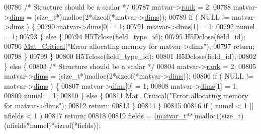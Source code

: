 \begin{DoxyCode}
00786             \textcolor{comment}{/* Structure should be a scalar */}
00787             matvar->\hyperlink{group___m_a_t_a84ba70c96ded13cc555fa75b768d9921}{rank} = 2;
00788             matvar->\hyperlink{group___m_a_t_a8e01234e1c862ce3472bb37f5a09b92c}{dims} = (\textcolor{keywordtype}{size\_t}*)malloc(2*\textcolor{keyword}{sizeof}(*matvar->\hyperlink{group___m_a_t_a8e01234e1c862ce3472bb37f5a09b92c}{dims}));
00789             \textcolor{keywordflow}{if} ( NULL != matvar->\hyperlink{group___m_a_t_a8e01234e1c862ce3472bb37f5a09b92c}{dims} ) \{
00790                 matvar->\hyperlink{group___m_a_t_a8e01234e1c862ce3472bb37f5a09b92c}{dims}[0] = 1;
00791                 matvar->\hyperlink{group___m_a_t_a8e01234e1c862ce3472bb37f5a09b92c}{dims}[1] = 1;
00792                 numel = 1;
00793             \} \textcolor{keywordflow}{else} \{
00794                 H5Tclose(field\_type\_id);
00795                 H5Dclose(field\_id);
00796                 \hyperlink{group__mat__util_gaf51f2bfbb5580f575e4dd79757e2b80c}{Mat\_Critical}(\textcolor{stringliteral}{"Error allocating memory for matvar->dims"});
00797                 \textcolor{keywordflow}{return};
00798             \}
00799         \}
00800         H5Tclose(field\_type\_id);
00801         H5Dclose(field\_id);
00802     \} \textcolor{keywordflow}{else} \{
00803         \textcolor{comment}{/* Structure should be a scalar */}
00804         matvar->\hyperlink{group___m_a_t_a84ba70c96ded13cc555fa75b768d9921}{rank} = 2;
00805         matvar->\hyperlink{group___m_a_t_a8e01234e1c862ce3472bb37f5a09b92c}{dims} = (\textcolor{keywordtype}{size\_t}*)malloc(2*\textcolor{keyword}{sizeof}(*matvar->\hyperlink{group___m_a_t_a8e01234e1c862ce3472bb37f5a09b92c}{dims}));
00806         \textcolor{keywordflow}{if} ( NULL != matvar->\hyperlink{group___m_a_t_a8e01234e1c862ce3472bb37f5a09b92c}{dims} ) \{
00807             matvar->\hyperlink{group___m_a_t_a8e01234e1c862ce3472bb37f5a09b92c}{dims}[0] = 1;
00808             matvar->\hyperlink{group___m_a_t_a8e01234e1c862ce3472bb37f5a09b92c}{dims}[1] = 1;
00809             numel = 1;
00810         \} \textcolor{keywordflow}{else} \{
00811             \hyperlink{group__mat__util_gaf51f2bfbb5580f575e4dd79757e2b80c}{Mat\_Critical}(\textcolor{stringliteral}{"Error allocating memory for matvar->dims"});
00812             \textcolor{keywordflow}{return};
00813         \}
00814     \}
00815 
00816     \textcolor{keywordflow}{if} ( numel < 1 || nfields < 1 )
00817         \textcolor{keywordflow}{return};
00818 
00819     fields = (\hyperlink{group___m_a_t_structmatvar__t}{matvar\_t}**)malloc((\textcolor{keywordtype}{size\_t})(nfields*numel)*\textcolor{keyword}{sizeof}(*fields));

\end{DoxyCode}
